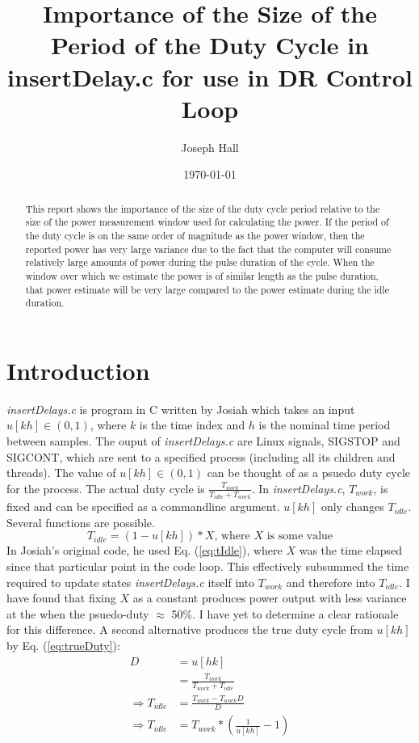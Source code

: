 \documentclass{article}
\newcommand{\mref}[1]{Eq. (\ref{#1})}
\begin{document}
\title{Importance of the Size of the Period of the Duty Cycle in insertDelay.c for use in DR Control Loop}
\author{Joseph Hall}
\date{\today}

\maketitle

\begin{abstract}
This report shows the importance of the size of the duty cycle period relative to the size of the power measurement window used for calculating the power.  If the period of the duty cycle is on the same order of magnitude as the power window, then the reported power has very large variance due to the fact that the computer will consume relatively large amounts of power during the pulse duration of the cycle.  When the window over which we estimate the power is of similar length as the pulse duration, that power estimate will be very large compared to the power estimate during the idle duration.
\end{abstract}

\section{Introduction}
\emph{insertDelays.c} is program in C written by Josiah which takes an input $u[kh] \in (0, 1)$, where $k$ is the time index and $h$ is the nominal time period between samples.  The ouput of \emph{insertDelays.c} are Linux signals, SIGSTOP and SIGCONT, which are sent to a specified process (including all its children and threads). The value of $u[kh] \in (0, 1)$ can be thought of as a psuedo duty cycle for the process.  The actual duty cycle is $\frac{T_{work}}{T_{idle}+T_{work}}$. In \emph{insertDelays.c}, $T_{work}$, is fixed and can be specified as a commandline argument.  $u[kh]$ only changes $T_{idle}$.  Several functions are possible.  
\begin{equation} \label{eq:tIdle} T_{idle}=(1-u[kh])*X\text{, where $X$ is some value} \end{equation}
In Josiah's original code, he used \mref{eq:tIdle}, where $X$ was the time elapsed since that particular point in the code loop. This effectively subsummed the time required to update states \emph{insertDelays.c} itself into $T_{work}$ and therefore into $T_{idle}$.  I have found that fixing $X$ as a constant produces power output with less variance at the when the psuedo-duty $\approx$ 50\%.  I have yet to determine a clear rationale for this difference. A second alternative produces the true duty cycle from $u[kh]$ by \mref{eq:trueDuty}:
\begin{equation}  
	\begin{aligned} 
		D&=u[hk] \\
		 &=\frac{T_{work}}{T_{work}+T_{idle}} \\ 
		\Rightarrow T_{idle}&=\frac{T_{work}-T_{work}D}{D} \\
		\Rightarrow T_{idle}&=T_{work}*(\frac{1}{u[kh]}-1) 
	\end{aligned} 
	\label{eq:trueDuty}
\end{equation}
\end{document}
